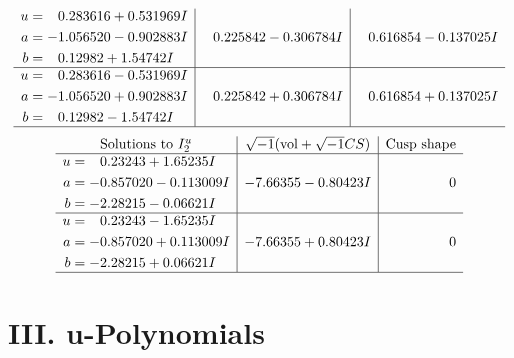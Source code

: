 \documentclass[1p]{elsarticle_modified}
\theoremstyle{definition}
\newcommand{\I}{\sqrt{-1}}
\begin{document}
$$\begin{array}{c|c|c}
\begin{aligned}
u &= \phantom{-}0.283616 + 0.531969 I \\
a &= -1.056520 - 0.902883 I \\
b &= \phantom{-}0.12982 + 1.54742 I\end{aligned}
 & \phantom{-}0.225842 - 0.306784 I & \phantom{-}0.616854 - 0.137025 I \\ \hline\begin{aligned}
u &= \phantom{-}0.283616 - 0.531969 I \\
a &= -1.056520 + 0.902883 I \\
b &= \phantom{-}0.12982 - 1.54742 I\end{aligned}
 & \phantom{-}0.225842 + 0.306784 I & \phantom{-}0.616854 + 0.137025 I\\
 \hline 
 \end{array}$$\newpage$$\begin{array}{c|c|c}  
\text{Solutions to }I^u_{2}& \I (\text{vol} + \sqrt{-1}CS) & \text{Cusp shape}\\
 \hline 
\begin{aligned}
u &= \phantom{-}0.23243 + 1.65235 I \\
a &= -0.857020 - 0.113009 I \\
b &= -2.28215 - 0.06621 I\end{aligned}
 & -7.66355 - 0.80423 I & \phantom{-0.000000 } 0 \\ \hline\begin{aligned}
u &= \phantom{-}0.23243 - 1.65235 I \\
a &= -0.857020 + 0.113009 I \\
b &= -2.28215 + 0.06621 I\end{aligned}
 & -7.66355 + 0.80423 I & \phantom{-0.000000 } 0\\
 \hline 
 \end{array}$$\newpage
\newpage\renewcommand{\arraystretch}{1}
\centering \section*{ III. u-Polynomials}
\end{document}
